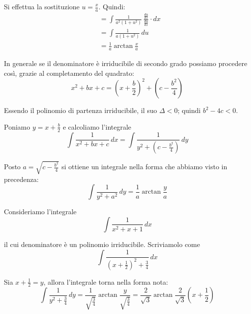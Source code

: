 Si effettua la sostituzione $u = \frac{x}{a}$. Quindi:
\begin{align*}
&= \int \frac{1}{a^2(1+u^2)} \, \frac{\frac{du}{dx}}{\frac{du}{dx}} \cdot dx \\
&= \int \frac{1}{a(1+u^2)} \, du \\
&= \frac{1}{a} \arctan \frac{x}{a}
\end{align*}

\begin{remark}
In generale se il denominatore è irriducibile di secondo grado possiamo procedere così, grazie al completamento del quadrato:
\begin{equation*}
x^2+bx+c = \left(x+\frac{b}{2} \right)^2 + \left(c-\frac{b^2}{4} \right)
\end{equation*}

Essendo il polinomio di partenza irriducibile, il suo $\Delta < 0$; quindi $b^2 - 4c < 0$. 

Poniamo $y = x + \frac{b}{2}$ e calcoliamo l'integrale
\begin{equation*}
\int \frac{1}{x^2+bx+c} \, dx = \int \frac{1}{y^2 + (c-\frac{b^2}{4})} \, dy
\end{equation*}

Posto $a = \sqrt{c-\frac{b^2}{4}}$ si ottiene un integrale nella forma che abbiamo visto in precedenza:
\begin{equation*}
\int \frac{1}{y^2+a^2} \, dy = \frac{1}{a} \arctan \frac{y}{a}
\end{equation*}
\end{remark}

\begin{example}
Consideriamo l'integrale
\begin{equation*}
\int \frac{1}{x^2+x+1} \, dx
\end{equation*}

il cui denominatore è un polinomio irriducibile. Scriviamolo come
\begin{equation*}
\int \frac{1}{(x+\frac{1}{2})^2 + \frac{3}{4}} \, dx
\end{equation*}
\end{example}

Sia $x+\frac{1}{2} = y$, allora l'integrale torna nella forma nota:
\begin{equation*}
\int \frac{1}{y^2+\frac{3}{4}} \, dy = \frac{1}{\sqrt{\frac{3}{4}}} \arctan \frac{y}{\sqrt{\frac{3}{4}}} = \frac{2}{\sqrt{3}} \arctan \frac{2}{\sqrt{3}} \left(x + \frac{1}{2}\right)
\end{equation*}

